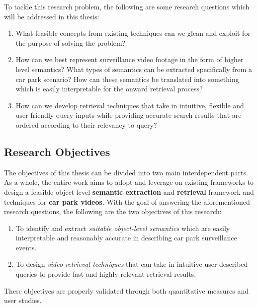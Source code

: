 To tackle this research problem, the following are some research questions which will be addressed in this thesis:
\begin{enumerate}
\item What feasible concepts from existing techniques can we glean and exploit for the purpose of solving the problem?
\item How can we best represent surveillance video footage in the form of higher level semantics? What types of semantics can be extracted specifically from a car park scenario? How can these semantics be translated into something which is easily interpretable for the onward retrieval process?
\item How can we develop retrieval techniques that take in intuitive, flexible and user-friendly query inputs while providing accurate search results that are ordered according to their relevancy to query?
\end{enumerate}



\subsection{Research Objectives}
The objectives of this thesis can be divided into two main interdependent parts. As a whole, the entire work aims to adopt and leverage on existing frameworks to design a feasible object-level \textbf{semantic extraction} and \textbf{retrieval} framework and techniques for \textbf{car park videos}. 
With the goal of answering the aforementioned research questions, the following are the two objectives of this research:

\begin{enumerate}
  \item To identify and extract \textit{suitable object-level semantics} which are easily interpretable and reasonably accurate in describing car park surveillance events.
  \item To design \textit{video retrieval techniques} that can take in intuitive user-described queries to provide fast and highly relevant retrieval results.
\end{enumerate}

These objectives are properly validated through both quantitative measures and user studies.  

